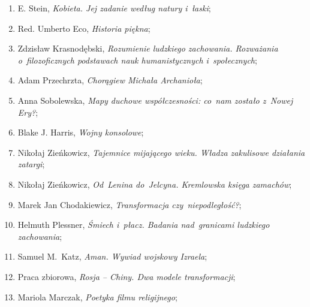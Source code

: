 \documentclass[a4paper,11pt]{article}
\begin{document}
\begin{enumerate}
\item E. Stein, \textit{Kobieta. Jej zadanie według natury i~łaski};



\item Red. Umberto Eco, \textit{Historia piękna};



\item Zdzisław Krasnodębski, \textit{Rozumienie ludzkiego zachowania.
    Rozważania o~filozoficznych podstawach nauk humanistycznych
    i~społecznych};



\item Adam Przechrzta, \textit{Chorągiew Michała Archanioła};



\item Anna Sobolewska, \textit{Mapy duchowe współczesności: co~nam
    zostało z~Nowej Ery?};



\item Blake J. Harris, \textit{Wojny konsolowe};



\item Nikołaj Zieńkowicz, \textit{Tajemnice mijającego wieku. Władza
    zakulisowe działania zatargi};



\item Nikołaj Zieńkowicz, \textit{Od~Lenina do~Jelcyna. Kremlowska
    księga zamachów};



\item Marek Jan Chodakiewicz, \textit{Transformacja czy~niepodległość?};



\item Helmuth Plessner, \textit{Śmiech i~płacz. Badania nad~granicami
    ludzkiego zachowania};



\item Samuel M.~Katz, \textit{Aman. Wywiad wojskowy Izraela};



\item Praca zbiorowa, \textit{Rosja -- Chiny. Dwa modele transformacji};



\item Mariola Marczak, \textit{Poetyka filmu religijnego};




\end{enumerate}
\end{document}
